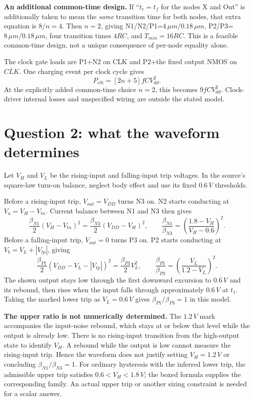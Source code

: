 \documentclass[10pt]{article}
\begin{document}
\textbf{An additional common-time design.} If ``$t_r=t_f$ for the nodes X and Out'' is additionally taken to mean the \emph{same} transition time for both nodes, that extra equation is $8/n=4$. Then $n=2$, giving N1/N2/P1=$4\,\mu m/0.18\,\mu m$, P2/P3=$8\,\mu m/0.18\,\mu m$, four transition times $4RC$, and $T_{min}=16RC$. This is a feasible common-time design, not a unique consequence of per-node equality alone.

The clock gate loads are P1+N2 on CLK and P2+the fixed output NMOS on $\overline{CLK}$. One charging event per clock cycle gives
\[\boxed{P_{clk}=[2n+5]fCV_{dd}^{2}.}\]
At the explicitly added common-time choice $n=2$, this becomes $9fCV_{dd}^{2}$. Clock-driver internal losses and unspecified wiring are outside the stated model.
\newpage
\section*{Question 2: what the waveform determines}
Let $V_H$ and $V_L$ be the rising-input and falling-input trip voltages. In the source's square-law turn-on balance, neglect body effect and use its fixed $0.6\,V$ thresholds.

Before a rising-input trip, $V_{out}=V_{DD}$ turns N3 on. N2 starts conducting at $V_a=V_H-V_{tn}$. Current balance between N1 and N3 then gives
\[\frac{\beta_{N1}}2(V_H-V_{tn})^2
=\frac{\beta_{N3}}2(V_{DD}-V_H)^2,
\qquad\boxed{\frac{\beta_{N1}}{\beta_{N3}}=
\left(\frac{1.8-V_H}{V_H-0.6}\right)^2.}\]
Before a falling-input trip, $V_{out}=0$ turns P3 on. P2 starts conducting at $V_b=V_L+|V_{tp}|$, giving
\[\frac{\beta_{P1}}2(V_{DD}-V_L-|V_{tp}|)^2
=\frac{\beta_{P3}}2V_L^2,
\qquad\boxed{\frac{\beta_{P1}}{\beta_{P3}}=
\left(\frac{V_L}{1.2-V_L}\right)^2.}\]
The shown output stays low through the first downward excursion to $0.6\,V$ and its rebound, then rises when the input falls through approximately $0.6\,V$ at $t_1$. Taking the marked lower trip as $V_L=0.6\,V$ gives $\beta_{P1}/\beta_{P3}=1$ in this model.

\textbf{The upper ratio is not numerically determined.} The $1.2\,V$ mark accompanies the input-noise rebound, which stays at or below that level while the output is already low. There is no rising-input transition from the high-output state to identify $V_H$. A rebound while the output is low cannot measure the rising-input trip. Hence the waveform does not justify setting $V_H=1.2\,V$ or concluding $\beta_{N1}/\beta_{N3}=1$. For ordinary hysteresis with the inferred lower trip, the admissible upper trip satisfies $0.6<V_H<1.8\,V$; the boxed formula supplies the corresponding family. An actual upper trip or another sizing constraint is needed for a scalar answer.
\end{document}
